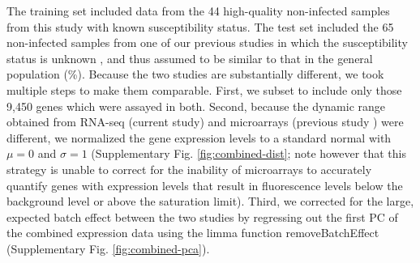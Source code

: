 \documentclass[fleqn,10pt]{wlscirep}
\begin{document}
The training set included data from the 44 high-quality non-infected
samples from this study with known susceptibility status. The test set
included the 65 non-infected samples from one of our previous studies
in which the susceptibility status is unknown \cite{Barreiro2012}, and
thus assumed to be similar to that in the general population
(\%). Because the two studies are substantially
different, we took multiple steps to make them comparable. First, we
subset to include only those 9,450 genes which were assayed in both.
Second, because the dynamic range obtained from RNA-seq (current
study) and microarrays (previous study \cite{Barreiro2012}) were
different, we normalized the gene expression levels to a standard
normal with $\mu = 0$ and $\sigma = 1$ (Supplementary Fig.
\ref{fig:combined-dist}; note however that this strategy is unable to
correct for the inability of microarrays to accurately quantify genes
with expression levels that result in fluorescence levels below the
background level or above the saturation limit). Third, we corrected
for the large, expected batch effect between the two studies by
regressing out the first PC of the combined expression data using the
limma function removeBatchEffect \cite{Ritchie2015} (Supplementary
Fig. \ref{fig:combined-pca}).
\end{document}

